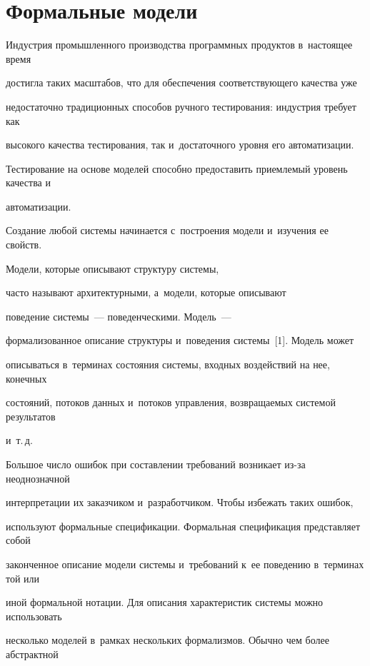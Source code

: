 \section{Формальные модели}





   Индустрия промышленного производства программных продуктов в~настоящее время


достигла таких масштабов, что для обеспечения соответствующего качества уже


недостаточно традиционных способов ручного тестирования: индустрия требует как


высокого качества тестирования, так и~достаточного уровня его автоматизации.


Тестирование на основе моделей способно предоставить приемлемый уровень качества и


автоматизации.





   Создание любой системы начинается с~построения модели и~изучения ее свойств.


Модели, которые описывают структуру системы,


часто называют архитектурными, а~модели, которые описывают


поведение системы~--- поведенческими. Модель~---


формализованное описание структуры и~поведения системы~[1]. Модель может


описываться в~терминах состояния системы, входных воздействий на нее, конечных


состояний, потоков данных и~потоков управления, возвращаемых системой результатов


и~т.\,д.





   Большое число ошибок при составлении требований возникает из-за неоднозначной


интерпретации их заказчиком и~разработчиком. Чтобы избежать таких ошибок,


используют формальные спецификации. Формальная спецификация представляет собой


законченное описание модели системы и~требований к~ее поведению в~терминах той или


иной формальной нотации. Для описания характеристик системы можно использовать


несколько моделей в~рамках нескольких формализмов. Обычно чем более абстрактной


